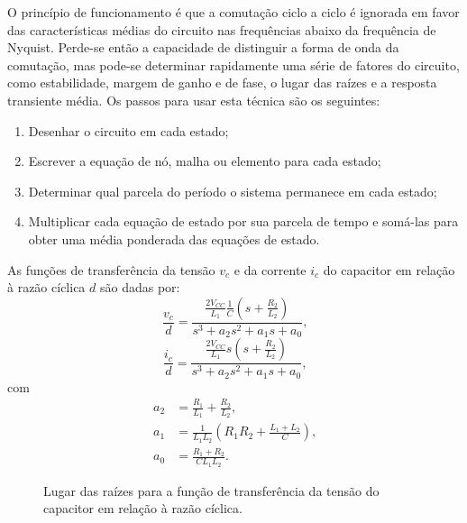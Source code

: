   O princípio de funcionamento é que a comutação ciclo a ciclo é ignorada em favor das características médias do circuito nas frequências abaixo da frequência de Nyquist. Perde-se então a capacidade de distinguir a forma de onda da comutação, mas pode-se determinar rapidamente uma série de fatores do circuito, como estabilidade, margem de ganho e de fase, o lugar das raízes e a resposta transiente média. Os passos para usar esta técnica são
  os seguintes:

  \begin{enumerate}
    \item Desenhar o circuito em cada estado;
    \item Escrever a equação de nó, malha ou elemento para cada estado;
    \item Determinar qual parcela do período o sistema permanece em cada estado;
    \item Multiplicar cada equação de estado por sua parcela de tempo e somá-las para obter uma média ponderada das equações de estado.
  \end{enumerate}

  As funções de transferência da tensão $v_c$ e da corrente $i_c$ do capacitor em relação à razão cíclica $d$ são dadas por:
  \begin{equation}
    \frac{v_c}{d} = \frac{\frac{2V_{CC}}{L_1} \frac{1}{C}
    	\left( s + \frac{R_2}{L_2} \right)}{s^3 + a_2 s^2 + a_1 s + a_0} \text{,}
    \label{eq:vc}
  \end{equation}
  \begin{equation}
    \frac{i_c}{d} = \frac{\frac{2V_{CC}}{L_1} s
    	\left( s + \frac{R_2}{L_2} \right)}{s^3 + a_2 s^2 + a_1 s + a_0} \text{,}
    \label{eq:ic}
  \end{equation}
  com
  \begin{equation}
  	\begin{split}
      a_2 & = \frac{R_1}{L_1} + \frac{R_2}{L_2} \text{,} \\
      a_1 & = \frac{1}{L_1 L_2} \left( R_1 R_2
      	+ \frac{L_1 + L_2}{C} \right) \text{,} \\
      a_0 & = \frac{R_1 + R_2}{C L_1 L_2} \text{.}
    \end{split}
  \end{equation}

  \begin{figure}[htb]
    \centering{
      }
    \renewcommand\figurename{Fig.}
    \caption{Lugar das raízes para a função de transferência da tensão do capacitor em relação à razão cíclica.}
    \label{fig:rlocus_vc}
  \end{figure}

